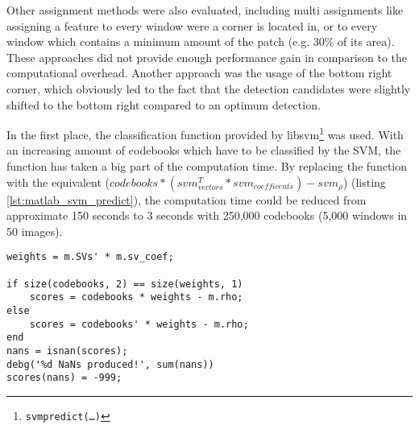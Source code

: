 Other assignment methods were also evaluated, including multi assignments like assigning a feature to every window were a corner is located in, or to every window which contains a minimum amount of the patch (e.g. 30\% of its area). These approaches did not provide enough performance gain in comparison to the computational overhead. Another approach was the usage of the bottom right corner, which obviously led to the fact that the detection candidates were slightly shifted to the bottom right compared to an optimum detection. 

In the first place, the classification function provided by libsvm\footnote{\texttt{svmpredict(\dots)}} was used. With an increasing amount of codebooks which have to be classified by the \ac{SVM}, the function has taken a big part of the computation time. By replacing the function with the \MATLAB equivalent ($codebooks * (svm_{vectors}^T * svm_{coefficents}) - svm_{\rho}$) (listing \ref{lst:matlab_svm_predict}), the computation time could be reduced from approximate 150 seconds to 3 seconds with 250,000 codebooks (5,000 windows in 50 images).


\begin{lstlisting}[caption={\MATLAB variant of svmpredict},label=lst:matlab_svm_predict]
weights = m.SVs' * m.sv_coef;

if size(codebooks, 2) == size(weights, 1)
    scores = codebooks * weights - m.rho;
else
    scores = codebooks' * weights - m.rho;
end
nans = isnan(scores);
debg('%d NaNs produced!', sum(nans))
scores(nans) = -999;
\end{lstlisting}
